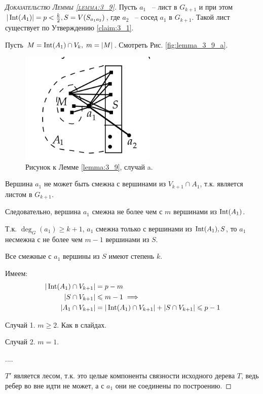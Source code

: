 

\begin{proof}[\normalfont\textsc{Доказательство Леммы \ref{lemma:3_9}}]
	Пусть $a_1$ ~-- лист в $G_{k + 1}$ и при этом $|\operatorname{Int}(A_1)| = p < \frac{k}{2}, S = V(S_{a_1a_2})$, где $a_2$ ~-- сосед $a_1$ в $G_{k + 1}$.
	Такой лист существует по Утверждению \ref{claim:3_1}.

	Пусть $M = \operatorname{Int}(A_1) \cap V_k, \; m = |M|$. Смотреть Рис. \eqref{fig:lemma_3_9_a}.

\begin{figure}[ht]
    \centering
	\includegraphics[width=0.25\columnwidth]{figures/lemma_3_9_a.png}
	\caption{Рисунок к Лемме \ref{lemma:3_9}, случай a.}
    \label{fig:lemma_3_9_a}
\end{figure}

Вершина $a_1$ не может быть смежна с вершинами из $V_{k + 1} \cap A_1$, т.к. является листом в $G_{k + 1}$.

Следовательно, вершина $a_1$ смежна не более чем с $m$ вершинами из $\operatorname{Int}(A_1)$.

Т.к. $\deg_G(a_1) \geqslant k + 1$, $a_1$ смежна только с вершинами из $\operatorname{Int}(A_1), S$, то $a_1$ несмежна с не более чем $m - 1$ вершинами из  $S$.

Все смежные с $a_1$ вершины из $S$ имеют степень $k$.

Имеем:
\begin{align*}
	|\operatorname{Int}(A_1) \cap V_{k + 1}| &= p - m \\ 
	|S \cap V _{k + 1}| &\leqslant m - 1 \implies \\
	|A_1 \cap V_{k + 1}| &= |\operatorname{Int}(A_1) \cap V_{k + 1}| + |S \cap V_{k + 1}| \leqslant p - 1
\end{align*}

Случай 1. $m \geqslant 2$. Как в слайдах.

Случай 2.  $m = 1$.

....

{\color{blue}$T'$ является лесом, т.к. это целые компоненты связности исходного дерева  $T$, ведь ребер во вне идти не может, а с $a_1$ они не соединены по построению.}



\end{proof}
